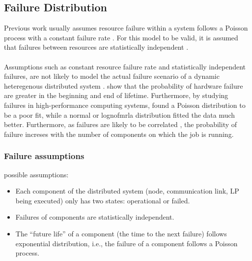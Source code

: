 \documentclass{cslthse-msc}
\begin{document}
\subsection{Failure Distribution}
Previous work usually assumes resource failure within a system follows a Poisson process with a constant failure rate \cite{algoMaxRelEndToEndConstraint} \cite{algoMinExTime} \cite{relModelDistSimSystem} \cite{optTaskAllocationForMaxRel} \cite{perfImplPerCheckPoint} \cite{optCheckpointInterval}. For this model to be valid, it is assumed that failures between resources are statistically independent \cite{algoMaxRelEndToEndConstraint}. 
\\\\
Assumptions such as constant resource failure rate and statistically independent failures, are not likely to model the actual failure scenario of a dynamic heteregenous distributed system \cite{algoMinExTime}. 
\cite{surveyReliabilityDistr} show that the probability of hardware failure are greater in the beginning and end of lifetime. Furthermore, by studying failures in high-performance computing systems, \cite{studyOfFailures} found a Poisson distribution to be a poor fit, while a normal or lognofmrla distribution fitted the data much better. Furthermore, as failures are likely to be correlated \cite{perfImplPerCheckPoint}, the probability of failure increses with the number of components on which the job is running.

 
\subsubsection{Failure assumptions}
possible assumptions:
\begin{itemize}
\item  Each component of the distributed system (node, communication link, LP being executed) only has two states: operational or failed.
\item Failures of components are statistically independent.
\item The “future life” of a component (the time to the next failure) follows exponential distribution, i.e., the failure of a component follows a Poisson process.
\end{itemize}

 
\end{document}
